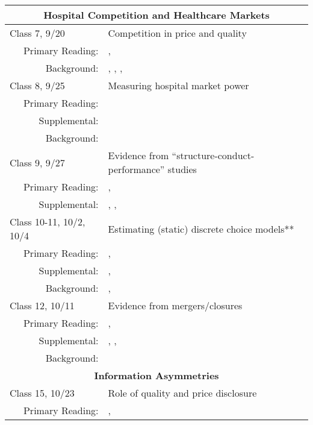 \documentclass{article}
\begin{document}
\begin{longtable}{lp{11cm}}
  \hline
  \multicolumn{2}{c}{\textbf{Hospital Competition and Healthcare Markets}} \\
  \hline\hline
  Class 7, 9/20 & Competition in price and quality \\
          \multicolumn{1}{r}{Primary Reading:} & \cite{fan2013}, \cite{lewis2016} \\
          \multicolumn{1}{r}{Background:} & \cite{spence1975}, \cite{mussa1978}, \cite{hausman1994}, \cite{dana2011} \\
  \hline
  Class 8, 9/25 & Measuring hospital market power \\
          \multicolumn{1}{r}{Primary Reading:} & \cite{dranove2016} \\
          \multicolumn{1}{r}{Supplemental:} & \cite{capps2003} \\
          \multicolumn{1}{r}{Background:} & \cite{dranove1990} \\
  \hline
  Class 9, 9/27 & Evidence from ``structure-conduct-performance'' studies \\
          \multicolumn{1}{r}{Primary Reading:} & \cite{kessler2000}, \cite{cooper2017} \\
          \multicolumn{1}{r}{Supplemental:} & \cite{dranove1992hospital}, \cite{lynk1995}, \cite{keeler1999} \\
  \hline
  Class 10-11, 10/2, 10/4 & Estimating (static) discrete choice models** \\
          \multicolumn{1}{r}{Primary Reading:} & \cite{nevo2000}, \cite{berry1994} \\
          \multicolumn{1}{r}{Supplemental:} & \cite{berry1995}, \cite{berry2004} \\
          \multicolumn{1}{r}{Background:} & \cite{deaton1980}, \cite{train2009} \\
  \hline
  Class 12, 10/11 & Evidence from mergers/closures \\
          \multicolumn{1}{r}{Primary Reading:} & \cite{dafny2009}, \cite{craig2018} \\
          \multicolumn{1}{r}{Supplemental:} & \cite{vita2001}, \cite{gaynor2003}, \cite{lindrooth2003}  \\
          \multicolumn{1}{r}{Background:} & \cite{gaynor2012rwjf} \\
  \hline
  \multicolumn{2}{c}{\textbf{Information Asymmetries}} \\
  \hline\hline
  Class 15, 10/23 & Role of quality and price disclosure \\
          \multicolumn{1}{r}{Primary Reading:} &  \cite{dranove1992}, \cite{abaluck2011} \\

\end{longtable}
\end{document}
